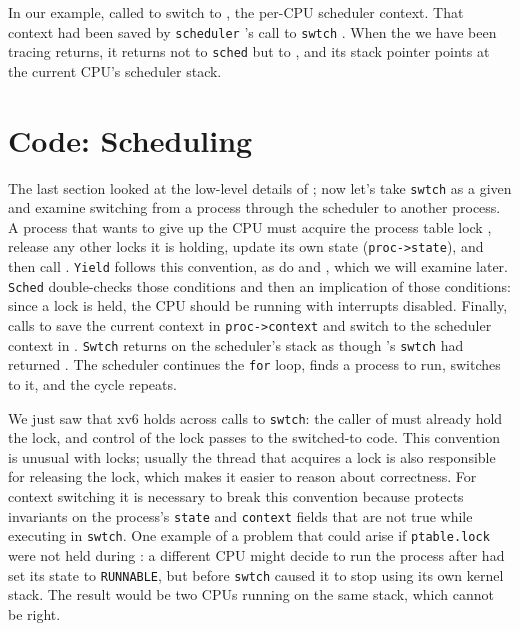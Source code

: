 In our example, 
called
to switch to
,
the per-CPU scheduler context.
That context had been saved by 
\lstinline{scheduler} 's
call to
\lstinline{swtch}
.
When the
we have been tracing returns,
it returns not to
\lstinline{sched}
but to 
,
and its stack pointer points at the current CPU's
scheduler stack.
\section{Code: Scheduling}

The last section looked at the low-level details of
;
now let's take 
\lstinline{swtch}
as a given and examine 
switching from a process through the scheduler to another process.
A process
that wants to give up the CPU must
acquire the process table lock
,
release any other locks it is holding,
update its own state
(\lstinline{proc->state}),
and then call
.
\lstinline{Yield}
follows this convention, as do
and
,
which we will examine later.
\lstinline{Sched}
double-checks those conditions
and then an implication of those conditions:
since a lock is held, the CPU should be
running with interrupts disabled.
Finally,
calls
to save the current context in 
\lstinline{proc->context}
and switch to the scheduler context in
.
\lstinline{Swtch}
returns on the scheduler's stack
as though
 's
\lstinline{swtch}
had returned
.
The scheduler continues the 
\lstinline{for}
loop, finds a process to run, 
switches to it, and the cycle repeats.

We just saw that xv6 holds
across calls to
\lstinline{swtch}:
the caller of
must already hold the lock, and control of the lock passes to the
switched-to code.  This convention is unusual with locks; usually
the thread that acquires a lock is also responsible for
releasing the lock, which makes it easier to reason about correctness.
For context switching it is necessary to break this convention because
protects invariants on the process's
\lstinline{state}
and
\lstinline{context}
fields that are not true while executing in
\lstinline{swtch}.
One example of a problem that could arise if
\lstinline{ptable.lock}
were not held during
:
a different CPU might decide
to run the process after 
had set its state to
\lstinline{RUNNABLE},
but before 
\lstinline{swtch}
caused it to stop using its own kernel stack.
The result would be two CPUs running on the same stack,
which cannot be right.

